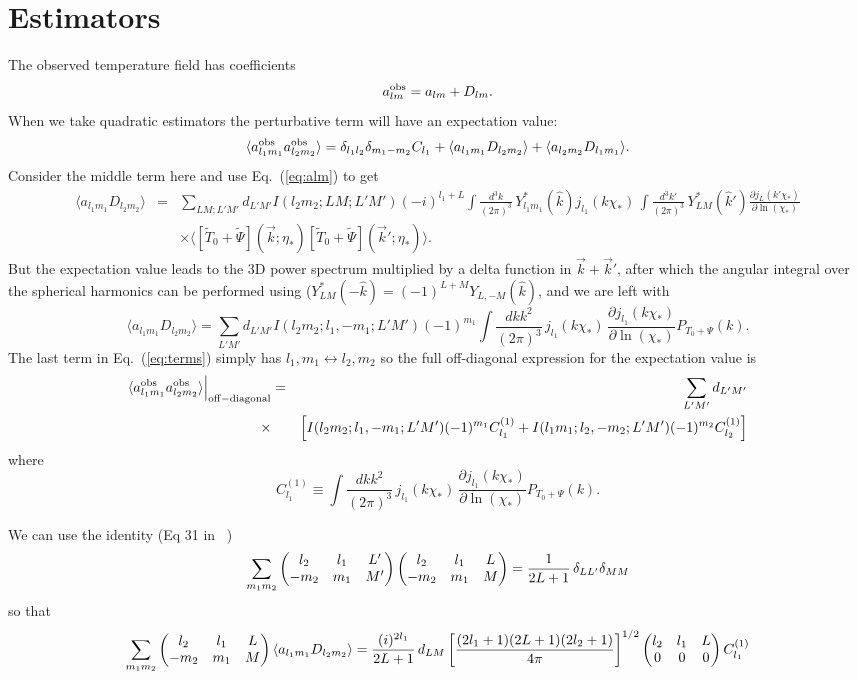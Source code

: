 \documentclass[prd,amsmath,amssymb,floatfix,superscriptaddress,nofootinbib,preprintnumbers]{revtex4-1}
\def\be{\begin{equation}}
\def\ee{\end{equation}}
\def\bea{\begin{eqnarray}}
\def\eea{\end{eqnarray}}
\newcommand{\vs}{\nonumber\\}
\newcommand{\ec}[1]{Eq.~(\ref{eq:#1})}
\newcommand{\eql}[1]{\label{eq:#1}}
\begin{document}
\section{Estimators}

The observed temperature field has coefficients
\be
a^{\rm obs}_{lm} = a_{lm} + D_{lm}
.\ee
When we take quadratic estimators the perturbative term will have an expectation value:
\be
\langle a^{\rm obs}_{l_1m_1} a^{\rm obs}_{l_2m_2} \rangle= \delta_{l_1l_2}\delta_{m_1-m_2}C_{l_1} + \langle a_{l_1m_1}D_{l_2m_2}\rangle+ \langle a_{l_2m_2}D_{l_1m_1}\rangle
.\eql{terms}
\ee
Consider the middle term here and use \ec{alm} to get
\bea
\langle a_{l_1m_1}D_{l_2m_2}\rangle&=&\sum_{LM;L'M'}d_{L'M'}  I(l_2m_2;LM;L'M')
 (-i)^{l_1+L} \int \frac{d^3k}{(2\pi)^3}\, Y_{l_1m_1}^*(\hat k) j_{l_1}(k\chi_*)\,
 \int \frac{d^3k'}{(2\pi)^3}\, Y_{LM}^*(\hat k') \frac{\partial j_L(k'\chi_*)}{\partial\ln(\chi_*)}
\vs
&&\times\langle  [\tilde T_0+\tilde\Psi](\vec k;\eta_*)  [\tilde T_0+\tilde\Psi](\vec k';\eta_*) \rangle.
\eea
But the expectation value leads to the 3D power spectrum multiplied by a delta function in $\vec k+\vec k'$, after which the angular integral over the spherical harmonics can be performed using ($Y_{LM}^*(-\hat k)=(-1)^{L+M}Y_{L,-M}(\hat k)$, and we are left with
\be
\langle a_{l_1m_1}D_{l_2m_2}\rangle=\sum_{L'M'}d_{L'M'}  I(l_2m_2;l_1,-m_1;L'M')
 (-1)^{m_1} \int \frac{dk k^2}{(2\pi)^3}\, j_{l_1}(k\chi_*)\,\frac{\partial j_{l_1}(k\chi_*)}{\partial\ln(\chi_*)}P_{T_0+\Psi}(k).
\ee
The last term in \ec{terms} simply has $l_1,m_1\leftrightarrow l_2,m_2$ so the full off-diagonal expression for the expectation value is
\bea
\langle a^{\rm obs}_{l_1m_1} a^{\rm obs}_{l_2m_2} \rangle\Big\vert_{\rm off-diagonal} &=&
\sum_{L'M'}d_{L'M'}  
 \vs
\times &&
 \left[
 I(l_2m_2;l_1,-m_1;L'M')
 (-1)^{m_1} C^{(1)}_{l_1}
  + 
 I(l_1m_1;l_2,-m_2;L'M')
 (-1)^{m_2}C^{(1)}_{l_2}
 \right]\eea
where
\be
C^{(1)}_{l_1}\equiv \int \frac{dk k^2}{(2\pi)^3}\, j_{l_1}(k\chi_*)\,\frac{\partial j_{l_1}(k\chi_*)}{\partial\ln(\chi_*)}P_{T_0+\Psi}(k).
\ee

We can use the identity (Eq 31 in ~\cite{Okamoto:2003zw})
\be
\sum_{m_1m_2} 
 \left(\begin{matrix} l_2 & l_1 &L'\cr -m_2&m_1&M'\end{matrix}\right)
 \left(\begin{matrix} l_2 & l_1 &L\cr -m_2&m_1&M\end{matrix}\right)
=\frac{1}{2L+1}\,\delta_{LL'}\delta_{MM}
\ee
so that
\be
\sum_{m_1m_2}  \left(\begin{matrix} l_2 & l_1 &L\cr -m_2&m_1&M\end{matrix}\right) \langle a_{l_1m_1}D_{l_2m_2}\rangle
= \frac{(i)^{2l_1}}{2L+1}\,d_{LM} 
 \left[ \frac{(2l_1+1)(2L+1)(2l_2+1)}{4\pi}\right]^{1/2}\left(\begin{matrix} l_2& l_1 &L\cr 0&0&0\end{matrix}\right)
 C^{(1)}_{l_1}
\ee
\end{document}
